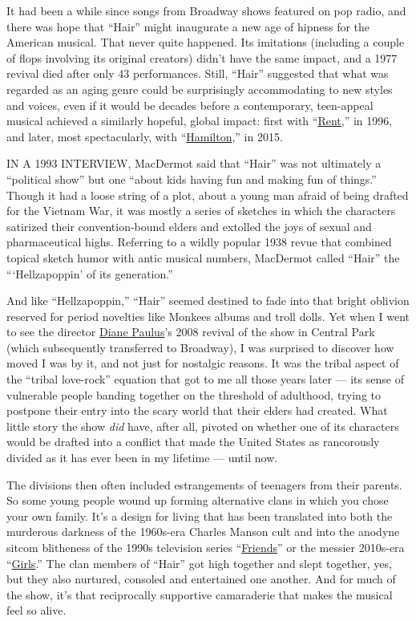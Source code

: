 It had been a while since songs from Broadway shows featured on pop
radio, and there was hope that ``Hair'' might inaugurate a new age of
hipness for the American musical. That never quite happened. Its
imitations (including a couple of flops involving its original creators)
didn't have the same impact, and a 1977 revival died after only 43
performances. Still, ``Hair'' suggested that what was regarded as an
aging genre could be surprisingly accommodating to new styles and
voices, even if it would be decades before a contemporary, teen-appeal
musical achieved a similarly hopeful, global impact: first with
``\href{https://www.nytimes.com/2008/09/21/theater/21ishe.html}{Rent},''
in 1996, and later, most spectacularly, with
``\href{https://www.nytimes.com/2016/06/12/theater/hamilton-inc-the-path-to-a-billion-dollar-show.html}{Hamilton},''
in 2015.

IN A 1993 INTERVIEW, MacDermot said that ``Hair'' was not ultimately a
``political show'' but one ``about kids having fun and making fun of
things.'' Though it had a loose string of a plot, about a young man
afraid of being drafted for the Vietnam War, it was mostly a series of
sketches in which the characters satirized their convention-bound elders
and extolled the joys of sexual and pharmaceutical highs. Referring to a
wildly popular 1938 revue that combined topical sketch humor with antic
musical numbers, MacDermot called ``Hair'' the ```Hellzapoppin' of its
generation.''

And like ``Hellzapoppin,'' ``Hair'' seemed destined to fade into that
bright oblivion reserved for period novelties like Monkees albums and
troll dolls. Yet when I went to see the director
\href{https://www.nytimes.com/2016/05/15/realestate/tony-nominee-diane-paulus-at-home-on-the-upper-west-side.html}{Diane
Paulus}'s 2008 revival of the show in Central Park (which subsequently
transferred to Broadway), I was surprised to discover how moved I was by
it, and not just for nostalgic reasons. It was the tribal aspect of the
``tribal love-rock'' equation that got to me all those years later ---
its sense of vulnerable people banding together on the threshold of
adulthood, trying to postpone their entry into the scary world that
their elders had created. What little story the show \emph{did} have,
after all, pivoted on whether one of its characters would be drafted
into a conflict that made the United States as rancorously divided as it
has ever been in my lifetime --- until now.

The divisions then often included estrangements of teenagers from their
parents. So some young people wound up forming alternative clans in
which you chose your own family. It's a design for living that has been
translated into both the murderous darkness of the 1960s-era Charles
Manson cult and into the anodyne sitcom blitheness of the 1990s
television series
``\href{https://www.nytimes.com/watching/recommendations/watching-tv-friends}{Friends}''
or the messier 2010s-era
``\href{https://www.nytimes.com/watching/recommendations/watching-tv-girls}{Girls}.''
The clan members of ``Hair'' got high together and slept together, yes,
but they also nurtured, consoled and entertained one another. And for
much of the show, it's that reciprocally supportive camaraderie that
makes the musical feel so alive.

